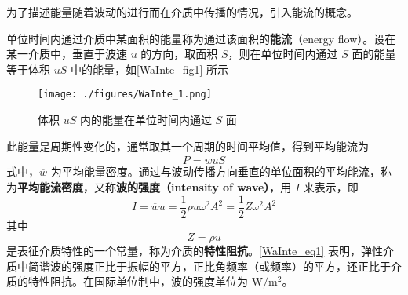 
\begin{issues}
\end{issues}


为了描述能量随着波动的进行而在介质中传播的情况，引入能流的概念。

单位时间内通过介质中某面积的能量称为通过该面积的\textbf{能流}（energy flow）。设在某一介质中，垂直于波速 $u$ 的方向，取面积 $S$，则在单位时间内通过 $S$ 面的能量等于体积 $uS$ 中的能量，如\autoref{WaInte_fig1} 所示
\begin{figure}[ht]
\centering
\texttt{[image: ./figures/WaInte\_1.png]}
\caption{体积 $uS$ 内的能量在单位时间内通过 $S$ 面} \label{WaInte_fig1}
\end{figure}

此能量是周期性变化的，通常取其一个周期的时间平均值，得到平均能流为
\begin{equation}
\overline{P}=\overline{w} u S
\end{equation}
式中，$\overline w$ 为平均能量密度。通过与波动传播方向垂直的单位面积的平均能流，称为\textbf{平均能流密度}，又称\textbf{波的强度（intensity of wave）}，用 $I$ 来表示，即
\begin{equation} \label{WaInte_eq1}
I=\overline{w} u=\frac{1}{2} \rho u \omega^{2} A^{2}=\frac{1}{2} Z \omega^{2} A^{2}
\end{equation}
其中
\begin{equation}
Z=\rho u
\end{equation}
是表征介质特性的一个常量，称为介质的\textbf{特性阻抗}。\autoref{WaInte_eq1} 表明，弹性介质中简谐波的强度正比于振幅的平方，正比角频率（或频率）的平方，还正比于介质的特性阻抗。在国际单位制中，波的强度单位为 $\mathrm{W}/\mathrm{m^2}$。